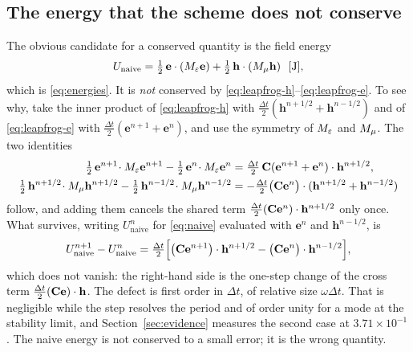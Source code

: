 \subsection{The energy that the scheme does not conserve}

The obvious candidate for a conserved quantity is the field energy
\begin{equation}
  U_{\mathrm{naive}} = \tfrac12\,\mathbf{e}\cdot({M_{\varepsilon}}\mathbf{e}) + \tfrac12\,\mathbf{h}\cdot({M_{\mu}}\mathbf{h})
  \ \ [\mathrm{J}],
  \label{eq:naive}
\end{equation}
which is \eqref{eq:energies}. It is \emph{not} conserved by \eqref{eq:leapfrog-h}--\eqref{eq:leapfrog-e}. To see
why, take the inner product of \eqref{eq:leapfrog-h} with $\tfrac{\Delta t}{2}(\mathbf{h}^{n+1/2}+
\mathbf{h}^{n-1/2})$ and of \eqref{eq:leapfrog-e} with $\tfrac{\Delta t}{2}(\mathbf{e}^{n+1}+\mathbf{e}^{n})$, and
use the symmetry of ${M_{\varepsilon}}$ and ${M_{\mu}}$. The two identities
\begin{align}
  \tfrac12\,\mathbf{e}^{n+1}\!\cdot{M_{\varepsilon}}\mathbf{e}^{n+1} - \tfrac12\,\mathbf{e}^{n}\!\cdot{M_{\varepsilon}}\mathbf{e}^{n}
  &= \tfrac{\Delta t}{2}\,\mathbf{C}(\mathbf{e}^{n+1}+\mathbf{e}^{n})\cdot\mathbf{h}^{n+1/2},
  \label{eq:telescope-e}\\
  \tfrac12\,\mathbf{h}^{n+1/2}\!\cdot{M_{\mu}}\mathbf{h}^{n+1/2}
  - \tfrac12\,\mathbf{h}^{n-1/2}\!\cdot{M_{\mu}}\mathbf{h}^{n-1/2}
  &= -\tfrac{\Delta t}{2}\bigl(\mathbf{C}\mathbf{e}^{n}\bigr)\cdot(\mathbf{h}^{n+1/2}+\mathbf{h}^{n-1/2})
  \label{eq:telescope-h}
\end{align}
follow, and adding them cancels the shared term $\tfrac{\Delta t}{2}(\mathbf{C}\mathbf{e}^{n})\cdot\mathbf{h}^{n+1/2}$
only once. What survives, writing $U_{\mathrm{naive}}^{n}$ for \eqref{eq:naive} evaluated with $\mathbf{e}^{n}$ and
$\mathbf{h}^{n-1/2}$, is
\begin{equation}
  U_{\mathrm{naive}}^{n+1} - U_{\mathrm{naive}}^{n}
  = \tfrac{\Delta t}{2}\Bigl[\bigl(\mathbf{C}\mathbf{e}^{n+1}\bigr)\cdot\mathbf{h}^{n+1/2}
  - \bigl(\mathbf{C}\mathbf{e}^{n}\bigr)\cdot\mathbf{h}^{n-1/2}\Bigr],
  \label{eq:naive-drift}
\end{equation}
which does not vanish: the right-hand side is the one-step change of the cross term
$\tfrac{\Delta t}{2}(\mathbf{C}\mathbf{e})\cdot\mathbf{h}$. The defect is first order in $\Delta t$, of relative size
$\omega\Delta t$. That is negligible while the step resolves the period and of order unity for a mode at the
stability limit, and Section~\ref{sec:evidence} measures the second case at $3.71\times10^{-1}$. The naive energy
is not conserved to a small error; it is the wrong quantity.

